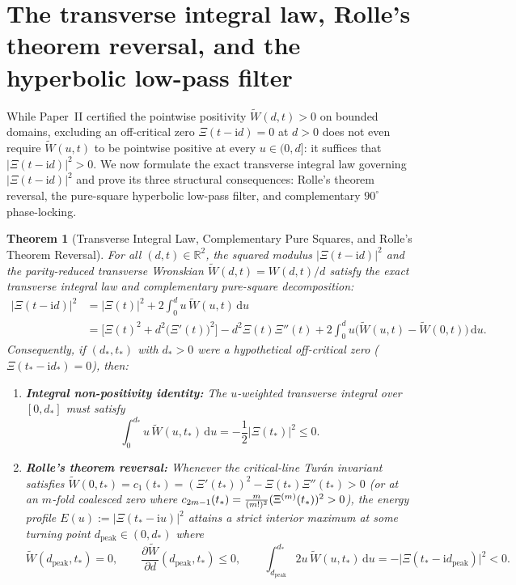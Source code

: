 \documentclass[11pt,a4paper,reqno]{amsart}
\newtheorem{theorem}{Theorem}[section]
\theoremstyle{definition}
\theoremstyle{remark}
\numberwithin{equation}{section}
\newcommand{\dd}{\mathrm{d}}
\newcommand{\ii}{\mathrm{i}}
\newcommand{\Wtil}{\widetilde{W}}
\newcommand{\fac}{\mathclose{\mathchar"0021}}
\begin{document}
\section{The transverse integral law, Rolle's theorem reversal, and the hyperbolic low-pass filter}\label{sec:integral_law}

While Paper~II \cite{Missiaen2026Paper2} certified the pointwise positivity $\Wtil(d,t) > 0$ on bounded domains, excluding an off-critical zero $\Xi(t-\ii d) = 0$ at $d > 0$ does not even require $\Wtil(u,t)$ to be pointwise positive at every $u \in (0,d]$: it suffices that $|\Xi(t-\ii d)|^2 > 0$. We now formulate the exact transverse integral law governing $|\Xi(t-\ii d)|^2$ and prove its three structural consequences: Rolle's theorem reversal, the pure-square hyperbolic low-pass filter, and complementary $90^\circ$ phase-locking.

\begin{theorem}[Transverse Integral Law, Complementary Pure Squares, and Rolle's Theorem Reversal]\label{thm:integral_law_rolle}
For all $(d,t) \in \mathbb{R}^2$, the squared modulus $|\Xi(t-\ii d)|^2$ and the parity-reduced transverse Wronskian $\Wtil(d,t) = W(d,t)/d$ satisfy the exact transverse integral law and complementary pure-square decomposition:
\begin{equation}\label{eq:boxed_integral_law}
\boxed{\begin{aligned}
\big|\Xi(t - \ii d)\big|^2 &= \big|\Xi(t)\big|^2 + 2\int_0^d u\,\Wtil(u,t)\,\dd u \\
&= \Big[\Xi(t)^2 + d^2\big(\Xi'(t)\big)^2\Big] - d^2\Xi(t)\Xi''(t) + 2\int_0^d u\big(\Wtil(u,t) - \Wtil(0,t)\big)\,\dd u.
\end{aligned}}
\end{equation}
Consequently, if $(d_*, t_*)$ with $d_* > 0$ were a hypothetical off-critical zero ($\Xi(t_* - \ii d_*) = 0$), then:
\begin{enumerate}
\item[\textup{(a)}] \textbf{Integral non-positivity identity:} The $u$-weighted transverse integral over $[0, d_*]$ must satisfy
\begin{equation}\label{eq:rolle_integral_cond}
\int_0^{d_*} u\,\Wtil(u, t_*)\,\dd u = -\frac{1}{2}\big|\Xi(t_*)\big|^2 \le 0.
\end{equation}
\item[\textup{(b)}] \textbf{Rolle's theorem reversal:} Whenever the critical-line Tur\'an invariant satisfies $\Wtil(0, t_*) = c_1(t_*) = (\Xi'(t_*))^2 - \Xi(t_*)\Xi''(t_*) > 0$ (or at an $m$-fold coalesced zero where $c_{2m-1}(t_*) = \frac{m}{(m\fac)^2}(\Xi^{(m)}(t_*))^2 > 0$), the energy profile $E(u) := |\Xi(t_* - \ii u)|^2$ attains a strict interior maximum at some turning point $d_{\mathrm{peak}} \in (0, d_*)$ where
\begin{equation}\label{eq:rolle_peak}
\Wtil(d_{\mathrm{peak}}, t_*) = 0, \qquad \frac{\partial \Wtil}{\partial d}(d_{\mathrm{peak}}, t_*) \le 0, \qquad \int_{d_{\mathrm{peak}}}^{d_*} 2u\,\Wtil(u, t_*)\,\dd u = -\big|\Xi(t_* - \ii d_{\mathrm{peak}})\big|^2 < 0.
\end{equation}
\end{enumerate}
\end{theorem}
\end{document}
